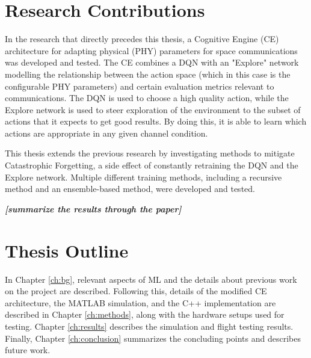 \section{Research Contributions}
\par In the research that directly precedes this thesis\cite{paulo_theory_paper}\cite{tim_implementation_paper}, a Cognitive Engine (CE) architecture for adapting physical (PHY) parameters for space communications was developed and tested. The CE combines a DQN with an "Explore" network modelling the relationship between the action space (which in this case is the configurable PHY parameters) and certain evaluation metrics relevant to communications. The DQN is used to choose a high quality action, while the Explore network is used to steer exploration of the environment to the subset of actions that it expects to get good results. By doing this, it is able to learn which actions are appropriate in any given channel condition.  
\par This thesis extends the previous research by investigating methods to mitigate Catastrophic Forgetting, a side effect of constantly retraining the DQN and the Explore network. Multiple different training methods, including a recursive method and an ensemble-based method, were developed and tested. 
\par 
\par \textit{\textbf{ [summarize the results through the paper]}}
\section{Thesis Outline}
\par In Chapter \ref{ch:bg}, relevant aspects of ML and the details about previous work on the project are described. Following this, details of the modified CE architecture, the MATLAB simulation, and the C++ implementation are described in Chapter \ref{ch:methods}, along with the hardware setups used for testing. Chapter \ref{ch:results} describes the simulation and flight testing results. Finally, Chapter \ref{ch:conclusion} summarizes the concluding points and describes future work.
